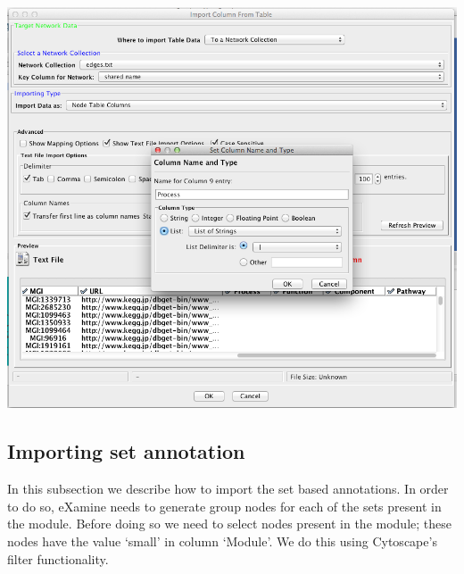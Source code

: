 \documentclass[a4paper,11pt]{article}
\begin{document}
\begin{enumerate}
\begin{enumerate}
\begin{center}
          \includegraphics[width=.7\textwidth]{images/2.png}
        \end{center}
    \end{enumerate}
\end{enumerate}

\subsection{Importing set annotation}

In this subsection we describe how to import the set based annotations. In order
to do so, eXamine needs to generate group nodes for each of the sets present in the
module. Before doing so we need to select nodes present in the module; these
nodes have the value `small' in column `Module'. We do this using Cytoscape's
filter functionality.
\end{document}
